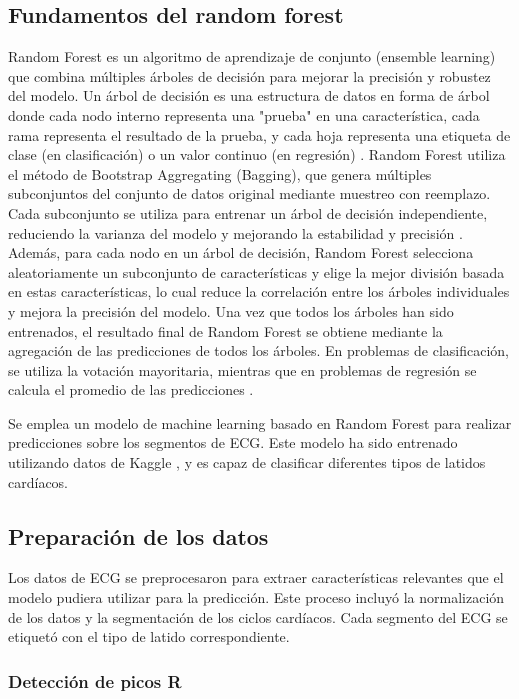 \subsection{Fundamentos del random forest}

Random Forest es un algoritmo de aprendizaje de conjunto (ensemble learning) que combina múltiples árboles de decisión para mejorar la precisión y robustez del modelo. Un árbol de decisión es una estructura de datos en forma de árbol donde cada nodo interno representa una "prueba" en una característica, cada rama representa el resultado de la prueba, y cada hoja representa una etiqueta de clase (en clasificación) o un valor continuo (en regresión) \cite{breiman2001random}. Random Forest utiliza el método de Bootstrap Aggregating (Bagging), que genera múltiples subconjuntos del conjunto de datos original mediante muestreo con reemplazo. Cada subconjunto se utiliza para entrenar un árbol de decisión independiente, reduciendo la varianza del modelo y mejorando la estabilidad y precisión \cite{breiman1996bagging}. Además, para cada nodo en un árbol de decisión, Random Forest selecciona aleatoriamente un subconjunto de características y elige la mejor división basada en estas características, lo cual reduce la correlación entre los árboles individuales y mejora la precisión del modelo. Una vez que todos los árboles han sido entrenados, el resultado final de Random Forest se obtiene mediante la agregación de las predicciones de todos los árboles. En problemas de clasificación, se utiliza la votación mayoritaria, mientras que en problemas de regresión se calcula el promedio de las predicciones \cite{breiman2001random}.

Se emplea un modelo de machine learning basado en Random Forest para realizar predicciones sobre los segmentos de ECG. Este modelo ha sido entrenado utilizando datos de Kaggle \cite{kaggle-data}, y es capaz de clasificar diferentes tipos de latidos cardíacos.

\subsection{Preparación de los datos}

Los datos de ECG se preprocesaron para extraer características relevantes que el modelo pudiera utilizar para la predicción. Este proceso incluyó la normalización de los datos y la segmentación de los ciclos cardíacos. Cada segmento del ECG se etiquetó con el tipo de latido correspondiente.

\subsubsection{Detección de picos R}

